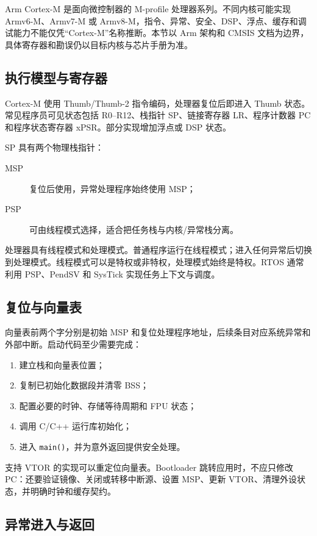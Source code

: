 Arm Cortex-M 是面向微控制器的 M-profile 处理器系列。不同内核可能实现 Armv6-M、Armv7-M 或 Armv8-M，指令、异常、安全、DSP、浮点、缓存和调试能力不能仅凭“Cortex-M”名称推断。本节以 Arm 架构和 CMSIS 文档为边界，具体寄存器和勘误仍以目标内核与芯片手册为准\cite{armv8m-architecture,cmsis-core}。

\subsection{执行模型与寄存器}

Cortex-M 使用 Thumb/Thumb-2 指令编码，处理器复位后即进入 Thumb 状态。常见程序员可见状态包括 R0--R12、栈指针 SP、链接寄存器 LR、程序计数器 PC 和程序状态寄存器 xPSR。部分实现增加浮点或 DSP 状态。

SP 具有两个物理栈指针：
\begin{description}
  \item[MSP] 复位后使用，异常处理程序始终使用 MSP；
  \item[PSP] 可由线程模式选择，适合把任务栈与内核/异常栈分离。
\end{description}

处理器具有线程模式和处理模式。普通程序运行在线程模式；进入任何异常后切换到处理模式。线程模式可以是特权或非特权，处理模式始终是特权。RTOS 通常利用 PSP、PendSV 和 SysTick 实现任务上下文与调度。

\subsection{复位与向量表}

向量表前两个字分别是初始 MSP 和复位处理程序地址，后续条目对应系统异常和外部中断。启动代码至少需要完成：
\begin{enumerate}
  \item 建立栈和向量表位置；
  \item 复制已初始化数据段并清零 BSS；
  \item 配置必要的时钟、存储等待周期和 FPU 状态；
  \item 调用 C/C++ 运行库初始化；
  \item 进入 \texttt{main()}，并为意外返回提供安全处理。
\end{enumerate}

支持 VTOR 的实现可以重定位向量表。Bootloader 跳转应用时，不应只修改 PC：还要验证镜像、关闭或转移中断源、设置 MSP、更新 VTOR、清理外设状态，并明确时钟和缓存契约。

\subsection{异常进入与返回}

